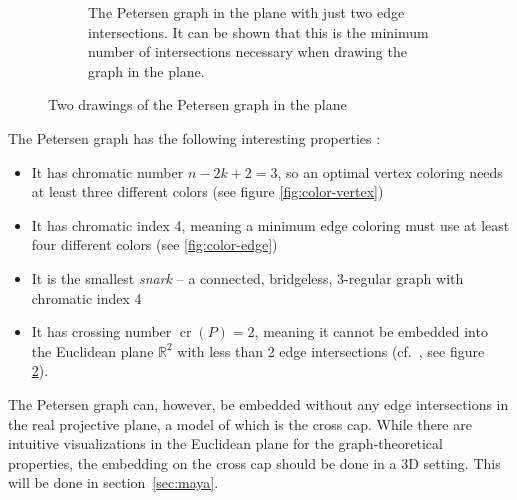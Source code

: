 \documentclass[11pt,            %
               a4paper,         %
               oneside,         %
               DIV12,           %
               fleqn,           %
               halfparskip,     %
               nochapterprefix, %
              ]{scrartcl} %
\theoremstyle{definition}
\begin{document}
\begin{figure}[p]
\begin{subfigure}[t]{.45\textwidth}
    \caption{The Petersen graph in the plane with just two edge
      intersections. It can be shown that this is the minimum number of
      intersections necessary when drawing the graph in the plane.}
    \label{fig:petersen-twointersect}
  \end{subfigure}
  \caption{Two drawings of the Petersen graph in the plane}
\end{figure}

The Petersen graph has the following interesting properties \cite{petersengraphbook,petersen}:

\begin{itemize}
  \item It has chromatic number $n - 2k + 2 = 3$, so an optimal vertex
    coloring needs at least three different colors (see figure
    \ref{fig:color-vertex})
  \item It has chromatic index 4, meaning a minimum edge coloring must
    use at least four different colors (see \ref{fig:color-edge})
  \item It is the smallest \emph{snark}\footnotemark[1]{} -- a
    connected, bridgeless\footnotemark[2]{}, 3-regular graph with chromatic index 4
  \item It has crossing number $\operatorname{cr}(P) = 2$,
    meaning it cannot be embedded into the Euclidean plane
    $\mathbb{R}^2$  with less than 2 edge intersections
    (cf.~\cite[p.~2]{crossingnr}, see figure~%
    \ref{fig:petersen-twointersect}).
\end{itemize}

The Petersen graph can, however, be embedded without any edge
intersections in the real projective plane, a model of which is the
cross cap.
While there are intuitive visualizations in the Euclidean plane for
the graph-theoretical properties, the embedding on the cross cap
should be done in a 3D setting. This will be done in
section~\ref{sec:maya}.
\end{document}
